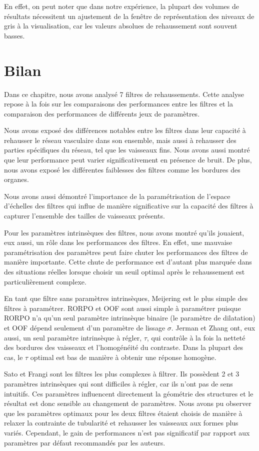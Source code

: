 En effet, on peut noter que dans notre expérience, la plupart des volumes de résultats nécessitent un ajustement de la fenêtre de représentation des niveaux de gris à la visualisation, car les valeurs absolues de rehaussement sont souvent basses.

\section{Bilan}

Dans ce chapitre, nous avons analysé 7 filtres de rehaussements. Cette analyse repose à la fois sur les comparaisons des performances entre les filtres et la comparaison des performances de différents jeux de paramètres. 

Nous avons exposé des différences notables entre les filtres dans leur capacité à rehausser le réseau vasculaire dans son ensemble, mais aussi à rehausser des parties spécifiques du réseau, tel que les vaisseaux fins. Nous avons aussi montré que leur performance peut varier significativement en présence de bruit. De plus, nous avons exposé les différentes faiblesses des filtres comme les bordures des organes.

Nous avons aussi démontré l'importance de la paramétrisation de l'espace d'échelles des filtres qui influe de manière significative sur la capacité des filtres à capturer l'ensemble des tailles de vaisseaux présents.

Pour les paramètres intrinsèques des filtres, nous avons montré qu'ils jouaient, eux aussi, un rôle dans les performances des filtres. En effet, une mauvaise paramétrisation des paramètres peut faire chuter les performances des filtres de manière importante. Cette chute de performance est d'autant plus marquée dans des situations réelles lorsque choisir un seuil optimal après le rehaussement est particulièrement complexe.

En tant que filtre sans paramètres intrinsèques, Meijering est le plus simple des filtres à paramétrer. RORPO et OOF sont aussi simple à paramétrer puisque RORPO n'a qu'un seul paramètre intrinsèque binaire (le paramètre de dilatation) et OOF dépend seulement d'un paramètre de lissage $\sigma$. Jerman et Zhang ont, eux aussi, un seul paramètre intrinsèque à régler, $\tau$, qui contrôle à la fois la netteté des bordures des vaisseaux et l'homogénéité du contraste. Dans la plupart des cas, le $\tau$ optimal est bas de manière à obtenir une réponse homogène. 

Sato et Frangi sont les filtres les plus complexes à filtrer. Ils possèdent 2 et 3 paramètres intrinsèques qui sont difficiles à régler, car ils n'ont pas de sens intuitifs. Ces paramètres influencent directement la géométrie des structures et le résultat est donc sensible au changement de paramètres. Nous avons pu observer que les paramètres optimaux pour les deux filtres étaient choisis de manière à relaxer la contrainte de tubularité et rehausser les vaisseaux aux formes plus variés. Cependant, le gain de performances n'est pas significatif par rapport aux paramètres par défaut recommandés par les auteurs.

